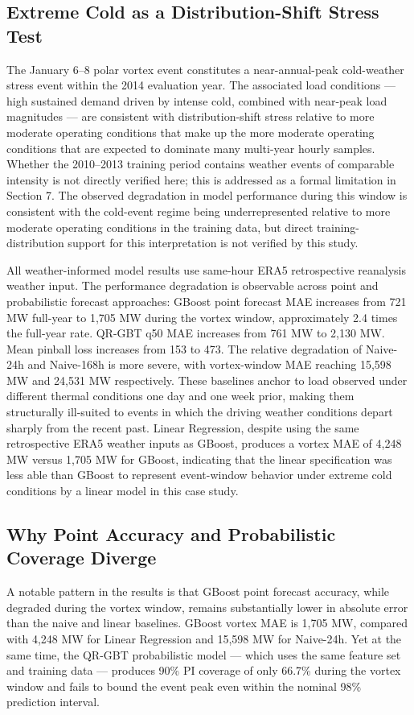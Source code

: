 \documentclass[12pt,a4paper]{article}
\begin{document}
\subsection{Extreme Cold as a Distribution-Shift Stress Test}
The January 6–8 polar vortex event constitutes a near-annual-peak cold-weather stress event within the 2014 evaluation year. The associated load conditions --- high sustained demand driven by intense cold, combined with near-peak load magnitudes --- are consistent with distribution-shift stress relative to more moderate operating conditions that make up the more moderate operating conditions that are expected to dominate many multi-year hourly samples. Whether the 2010–2013 training period contains weather events of comparable intensity is not directly verified here; this is addressed as a formal limitation in Section 7. The observed degradation in model performance during this window is consistent with the cold-event regime being underrepresented relative to more moderate operating conditions in the training data, but direct training-distribution support for this interpretation is not verified by this study.


All weather-informed model results use same-hour ERA5 retrospective reanalysis weather input. The performance degradation is observable across point and probabilistic forecast approaches: GBoost point forecast MAE increases from 721 MW full-year to 1,705 MW during the vortex window, approximately 2.4 times the full-year rate. QR-GBT q50 MAE increases from 761 MW to 2,130 MW. Mean pinball loss increases from 153 to 473.
The relative degradation of Naive-24h and Naive-168h is more severe, with vortex-window MAE reaching 15,598 MW and 24,531 MW respectively. These baselines anchor to load observed under different thermal conditions one day and one week prior, making them structurally ill-suited to events in which the driving weather conditions depart sharply from the recent past. Linear Regression, despite using the same retrospective ERA5 weather inputs as GBoost, produces a vortex MAE of 4,248 MW versus 1,705 MW for GBoost, indicating that the linear specification was less able than GBoost to represent event-window behavior under extreme cold conditions by a linear model in this case study.
\subsection{Why Point Accuracy and Probabilistic Coverage Diverge}
A notable pattern in the results is that GBoost point forecast accuracy, while degraded during the vortex window, remains substantially lower in absolute error than the naive and linear baselines. GBoost vortex MAE is 1,705 MW, compared with 4,248 MW for Linear Regression and 15,598 MW for Naive-24h. Yet at the same time, the QR-GBT probabilistic model --- which uses the same feature set and training data --- produces 90\% PI coverage of only 66.7\% during the vortex window and fails to bound the event peak even within the nominal 98\% prediction interval.
\end{document}
